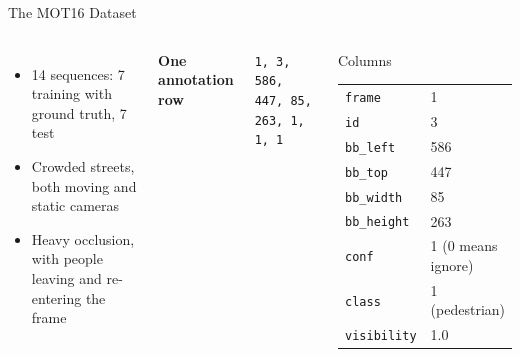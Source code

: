 \documentclass[aspectratio=169,11pt]{beamer}
\begin{document}
\begin{frame}{The MOT16 Dataset}
  \begin{columns}[T,onlytextwidth]
      \begin{itemize}
        \item 14 sequences: 7 training with ground truth, 7 test
        \item Crowded streets, both moving and static cameras
        \item Heavy occlusion, with people leaving and re-entering the frame
      \end{itemize}
      \vspace{0.9em}
      \textbf{One annotation row}
      \vspace{0.3em}

      {\footnotesize\texttt{1, 3, 586, 447, 85, 263, 1, 1, 1}}
      \begin{block}{Columns}
        {\footnotesize
        \begin{tabular}{ll}
          \texttt{frame}      & 1 \\
          \texttt{id}         & 3 \\
          \texttt{bb\_left}   & 586 \\
          \texttt{bb\_top}    & 447 \\
          \texttt{bb\_width}  & 85 \\
          \texttt{bb\_height} & 263 \\
          \texttt{conf}       & 1 (0 means ignore) \\
          \texttt{class}      & 1 (pedestrian) \\
          \texttt{visibility} & 1.0 \\
        \end{tabular}}
      \end{block}
  \end{columns}
\end{frame}
\end{document}
